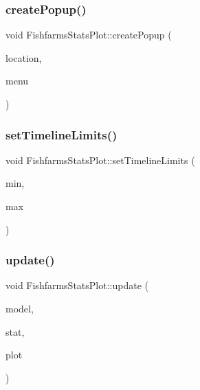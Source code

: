 \subsubsection{\texorpdfstring{createPopup()}{createPopup()}}
{\footnotesize\ttfamily void Fishfarms\+Stats\+Plot\+::create\+Popup (\begin{DoxyParamCaption}\item[{\mbox{\hyperlink{class_graph_interaction_controller_a67e6eba082927bf2b984bed54fe32764}{Graph\+Interaction\+Controller\+::\+Popup\+Menu\+Location}}}]{location,  }\item[{Q\+Menu $\ast$}]{menu }\end{DoxyParamCaption})}

\mbox{\label{class_fishfarms_stats_plot_a2e4fa56345e351504d49824db7691d30}} 
\subsubsection{\texorpdfstring{setTimelineLimits()}{setTimelineLimits()}}
{\footnotesize\ttfamily void Fishfarms\+Stats\+Plot\+::set\+Timeline\+Limits (\begin{DoxyParamCaption}\item[{double}]{min,  }\item[{double}]{max }\end{DoxyParamCaption})\hspace{0.3cm}{\ttfamily [inline]}}

\mbox{\label{class_fishfarms_stats_plot_a90281984f8eada59def8a778e04a0896}} 
\subsubsection{\texorpdfstring{update()}{update()}\hspace{0.1cm}{\footnotesize\ttfamily [1/2]}}
{\footnotesize\ttfamily void Fishfarms\+Stats\+Plot\+::update (\begin{DoxyParamCaption}\item[{\mbox{\hyperlink{class_displace_model}{Displace\+Model}} $\ast$}]{model,  }\item[{\mbox{\hyperlink{namespacedisplace_1_1plot_a4746af73ffe0625cf87b8fb07fd5bfa4}{displace\+::plot\+::\+Fishfarms\+Stat}}}]{stat,  }\item[{\mbox{\hyperlink{class_q_custom_plot}{Q\+Custom\+Plot}} $\ast$}]{plot }\end{DoxyParamCaption})}

